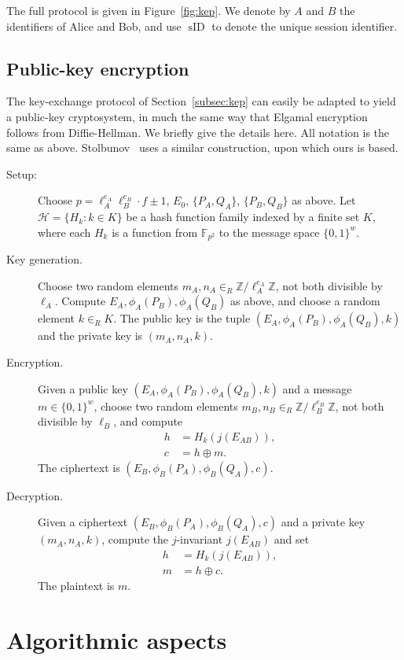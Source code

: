 \documentclass[envcountsect,envcountsame,runningheads]{llncs}   %
\newcommand{\ZZ}{{\mathbb{Z}}}
\newcommand{\FF}{{\mathbb{F}}}
\newcommand{\id}{\operatorname{sID}}
\begin{document}
The full protocol is given in Figure~\ref{fig:kep}. We denote by $A$
and $B$ the identifiers of Alice and Bob, and use $\id$ to denote the
unique session identifier.

\subsection{Public-key encryption}\label{subsec:pk}

The key-exchange protocol of Section~\ref{subsec:kep} can easily be
adapted to yield a public-key cryptosystem, in much the same way that
Elgamal encryption follows from Diffie-Hellman. We briefly give the
details here. All notation is the same as above. Stolbunov~\cite{Stol}
uses a similar construction, upon which ours is based.

\begin{description}
\item[Setup:] Choose $p = \ell_A^{e_A} \ell_B^{e_B} \cdot f \pm 1$,
  $E_0$, $\{P_A,Q_A\}$, $\{P_B,Q_B\}$ as above. Let $\mathcal{H} =
  \{H_k: k \in K\}$ be a hash function family indexed by a finite set
  $K$, where each $H_k$ is a function from $\FF_{p^2}$ to the message
  space $\{0,1\}^w$.
\item[Key generation.] Choose two random elements $m_A,n_A \in_R
\ZZ/\ell_A^{e_A}\ZZ$, not both divisible by $\ell_A$. Compute $E_A,
\phi_A(P_B), \phi_A(Q_B)$ as above, and choose a random element $k
\in_R K$. The public key is the tuple $(E_A, \phi_A(P_B), \phi_A(Q_B), k)$ and
the private key is $(m_A,n_A,k)$.
\item[Encryption.] Given a public key $(E_A, \phi_A(P_B), \phi_A(Q_B),
  k)$ and a message $m \in \{0,1\}^w$, choose two random elements
  $m_B,n_B \in_R \ZZ/\ell_B^{e_B}\ZZ$, not both divisible by $\ell_B$,
  and compute
\begin{align*}
h &= H_k(j(E_{AB})), \\
c &= h \oplus m.
\end{align*}
The ciphertext is $(E_B, \phi_B(P_A), \phi_B(Q_A), c)$.
\item[Decryption.] Given a ciphertext $(E_B, \phi_B(P_A), \phi_B(Q_A),
  c)$ and a private key $(m_A,n_A,k)$, compute the $j$-invariant
  $j(E_{AB})$ and set
\begin{align*}
h &= H_k(j(E_{AB})), \\
m &= h \oplus c.
\end{align*}
The plaintext is $m$.
\end{description}

\section{Algorithmic aspects}\label{sec:alg}
\end{document}
